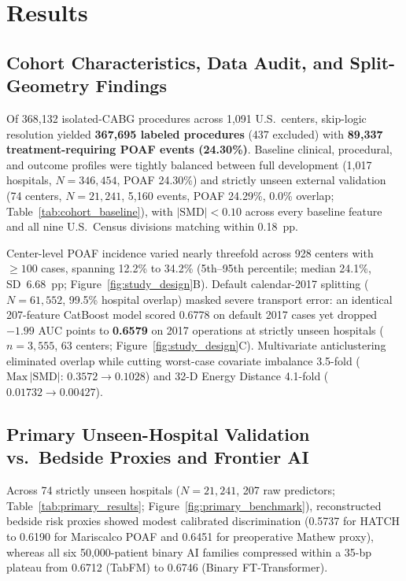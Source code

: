 \section{Results}
\label{sec:results}

\subsection{Cohort Characteristics, Data Audit, and Split-Geometry Findings}
Of 368,132 isolated-CABG procedures across 1,091 U.S.\ centers, skip-logic resolution yielded \textbf{367,695 labeled procedures} (437 excluded) with \textbf{89,337 treatment-requiring POAF events (24.30\%)}. Baseline clinical, procedural, and outcome profiles were tightly balanced between full development (1,017 hospitals, $N=346{,}454$, POAF 24.30\%) and strictly unseen external validation (74 centers, $N=21{,}241$, 5,160 events, POAF 24.29\%, 0.0\% overlap; Table~\ref{tab:cohort_baseline}), with $|\mathrm{SMD}| < 0.10$ across every baseline feature and all nine U.S.\ Census divisions matching within 0.18~pp.



Center-level POAF incidence varied nearly threefold across 928 centers with $\ge 100$ cases, spanning 12.2\% to 34.2\% (5th--95th percentile; median 24.1\%, SD~6.68~pp; Figure~\ref{fig:study_design}B). Default calendar-2017 splitting ($N=61{,}552$, 99.5\% hospital overlap) masked severe transport error: an identical 207-feature CatBoost model scored 0.6778 on default 2017 cases yet dropped $-1.99$ AUC points to \textbf{0.6579} on 2017 operations at strictly unseen hospitals ($n=3{,}555$, 63 centers; Figure~\ref{fig:study_design}C). Multivariate anticlustering eliminated overlap while cutting worst-case covariate imbalance 3.5-fold ($\mathrm{Max}\,|\mathrm{SMD}|$: $0.3572 \to 0.1028$) and 32-D Energy Distance 4.1-fold ($0.01732 \to 0.00427$).

\subsection{Primary Unseen-Hospital Validation vs.\ Bedside Proxies and Frontier AI}
Across 74 strictly unseen hospitals ($N=21{,}241$, 207 raw predictors; Table~\ref{tab:primary_results}; Figure~\ref{fig:primary_benchmark}), reconstructed bedside risk proxies showed modest calibrated discrimination (0.5737 for HATCH to 0.6190 for Mariscalco POAF and 0.6451 for preoperative Mathew proxy), whereas all six 50,000-patient binary AI families compressed within a 35-bp plateau from 0.6712 (TabFM) to 0.6746 (Binary FT-Transformer).


